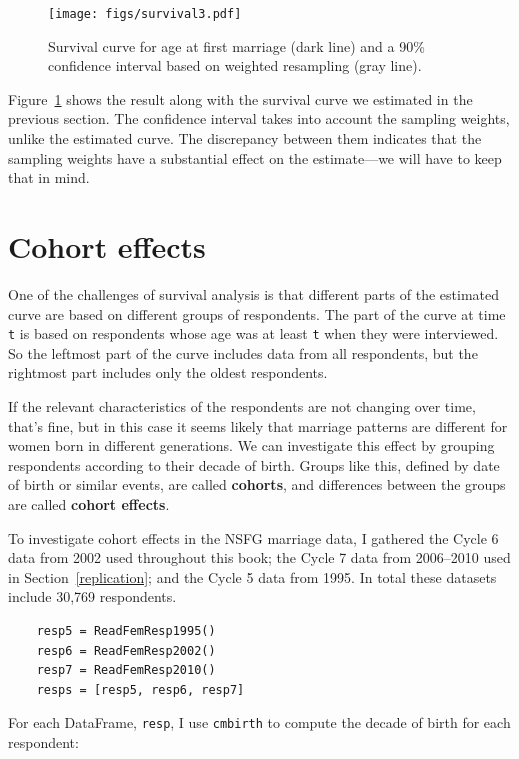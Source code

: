 \documentclass[12pt]{book}
\theoremstyle{exercise}
\begin{document}
\begin{figure}
\centerline{\texttt{[image: figs/survival3.pdf]}}
\caption{Survival curve for age at first marriage (dark line) and a 90\%
confidence interval based on weighted resampling (gray line).}%
\label{survival3}
\end{figure}

Figure~\ref{survival3} shows the result along with the survival
curve we estimated in the previous section.  The confidence
interval takes into account the sampling weights, unlike the estimated
curve.  The discrepancy between them indicates that the sampling
weights have a substantial effect on the estimate---we will have
to keep that in mind.%
%


\section{Cohort effects}

One of the challenges of survival analysis is that different parts
of the estimated curve are based on different groups of respondents.
The part of the curve at time {\tt t} is based on respondents
whose age was at least {\tt t} when they were interviewed.
So the leftmost part of the curve includes data from all respondents,
but the rightmost part includes only the oldest respondents.

If the relevant characteristics of the respondents are not changing
over time, that's fine, but in this case it seems likely that marriage
patterns are different for women born in different generations.
We can investigate this effect by grouping respondents according
to their decade of birth.  Groups like this, defined by date of
birth or similar events, are called {\bf cohorts}, and differences
between the groups are called {\bf cohort effects}.%
%

To investigate cohort effects in the NSFG marriage data, I gathered
the Cycle 6 data from 2002 used throughout this book;
the Cycle 7 data from 2006--2010 used in Section~\ref{replication};
and the Cycle 5 data from 1995.  In total these datasets include
30,769 respondents.

\begin{verbatim}
    resp5 = ReadFemResp1995()
    resp6 = ReadFemResp2002()
    resp7 = ReadFemResp2010()
    resps = [resp5, resp6, resp7]
\end{verbatim}

For each DataFrame, {\tt resp}, I use {\tt cmbirth} to compute the
decade of birth for each respondent:%
%
\end{document}
